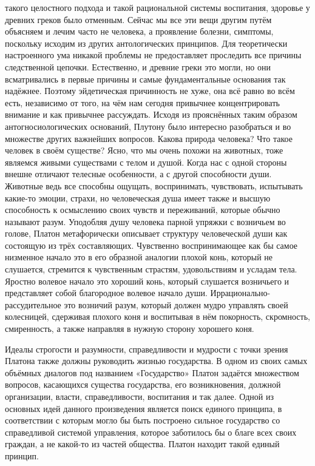 такого целостного подхода и такой рациональной системы воспитания, здоровье у
древних греков было отменным. Сейчас мы все эти вещи другим путём объясняем и
лечим часто не человека, а проявление болезни, симптомы, поскольку исходим из
других антологических принципов. Для теоретически настроенного ума никакой
проблемы не предоставляет проследить все причины следственной цепочки.
Естественно, и древние греки это могли, но они всматривались в первые причины и
самые фундаментальные основания так надёжнее. Поэтому эйдетическая причинность
не хуже, она всё равно во всём есть, независимо от того, на чём нам сегодня
привычнее концентрировать внимание и как привычнее рассуждать. Исходя из
прояснённых таким образом антогносиологических оснований, Плутону было интересно
разобраться и во множестве других важнейших вопросов. Какова природа человека?
Что такое человек в своём существе? Ясно, что мы очень похожи на животных, тоже
являемся живыми существами с телом и душой. Когда нас с одной стороны внешне
отличают телесные особенности, а с другой способности души. Животные ведь все
способны ощущать, воспринимать, чувствовать, испытывать какие-то эмоции, страхи,
но человеческая душа имеет также и высшую способность к осмыслению своих чувств
и переживаний, которые обычно называют разум. Уподобляя душу человека парной
упряжки с возничьем во голове, Платон метафорически описывает структуру
человеческой души как состоящую из трёх составляющих. Чувственно воспринимающее
как бы самое низменное начало это в его образной аналогии плохой конь, который
не слушается, стремится к чувственным страстям, удовольствиям и усладам тела.
Яростно волевое начало это хороший конь, который слушается возничьего и
представляет собой благородное волевое начало души. Иррационально-рассудительное
это возничий разум, который должен мудро управлять своей колесницей, сдерживая
плохого коня и воспитывая в нём покорность, скромность, смиренность, а также
направляя в нужную сторону хорошего коня. 

Идеалы строгости и разумности,
справедливости и мудрости с точки зрения Платона также должны руководить жизнью
государства. В одном из своих самых объёмных диалогов под названием
«Государство» Платон задаётся множеством вопросов, касающихся существа
государства, его возникновения, должной организации, власти, справедливости,
воспитания и так далее. Одной из основных идей данного произведения является
поиск единого принципа, в соответствии с которым могло бы быть построено сильное
государство со справедливой системой управления, которое заботилось бы о благе
всех своих граждан, а не какой-то из частей общества. Платон находит такой
единый принцип. 

